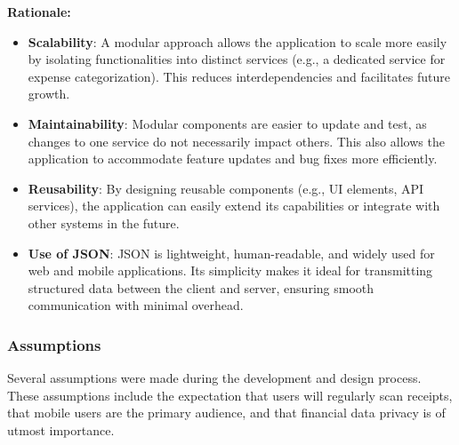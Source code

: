 \documentclass[12pt]{article}
\begin{document}
\noindent\textbf{Rationale:}
\begin{itemize}
    \item \textbf{Scalability}: A modular approach allows the application to scale more easily by isolating functionalities into distinct services (e.g., a dedicated service for expense categorization). This reduces interdependencies and facilitates future growth.
    \item \textbf{Maintainability}: Modular components are easier to update and test, as changes to one service do not necessarily impact others. This also allows the application to accommodate feature updates and bug fixes more efficiently.
    \item \textbf{Reusability}: By designing reusable components (e.g., UI elements, API services), the application can easily extend its capabilities or integrate with other systems in the future.
    \item \textbf{Use of JSON}: JSON is lightweight, human-readable, and widely used for web and mobile applications. Its simplicity makes it ideal for transmitting structured data between the client and server, ensuring smooth communication with minimal overhead.
\end{itemize}

\subsubsection{Assumptions}
Several assumptions were made during the development and design process. These assumptions include the expectation that users will regularly scan receipts, that mobile users are the primary audience, and that financial data privacy is of utmost importance.\\
\end{document}
